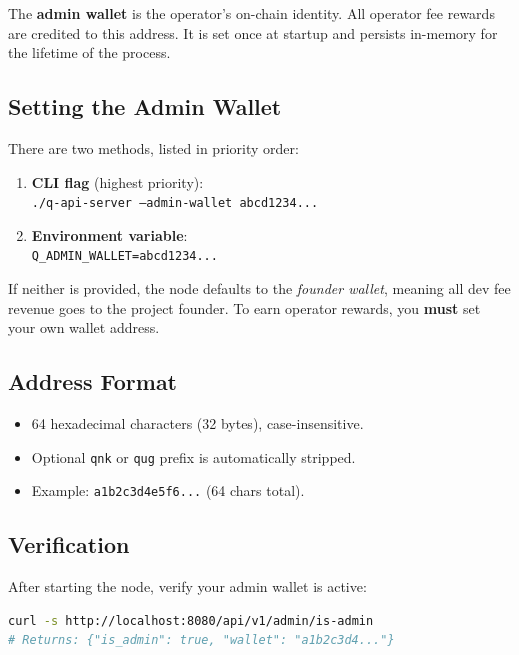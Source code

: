 \documentclass[11pt,a4paper]{article}
\begin{document}
The \textbf{admin wallet} is the operator's on-chain identity. All operator
fee rewards are credited to this address. It is set once at startup and
persists in-memory for the lifetime of the process.

\subsection{Setting the Admin Wallet}

There are two methods, listed in priority order:

\begin{enumerate}
    \item \textbf{CLI flag} (highest priority):\\
        \texttt{./q-api-server --admin-wallet abcd1234...}
    \item \textbf{Environment variable}:\\
        \texttt{Q\_ADMIN\_WALLET=abcd1234...}
\end{enumerate}

If neither is provided, the node defaults to the \emph{founder wallet},
meaning all dev fee revenue goes to the project founder. To earn operator
rewards, you \textbf{must} set your own wallet address.

\subsection{Address Format}

\begin{itemize}[nosep]
    \item 64 hexadecimal characters (32 bytes), case-insensitive.
    \item Optional \texttt{qnk} or \texttt{qug} prefix is automatically stripped.
    \item Example: \texttt{a1b2c3d4e5f6...} (64 chars total).
\end{itemize}

\subsection{Verification}

After starting the node, verify your admin wallet is active:

\begin{lstlisting}[language=bash,title={Check admin status}]
curl -s http://localhost:8080/api/v1/admin/is-admin
# Returns: {"is_admin": true, "wallet": "a1b2c3d4..."}
\end{lstlisting}
\end{document}
